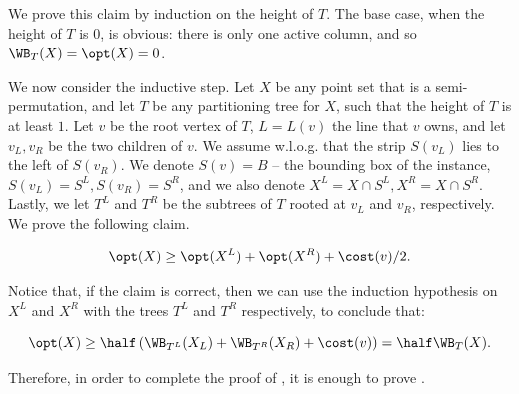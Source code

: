 We prove this claim by induction on the height of $T$. 
The base case, when the height of $T$ is $0$, is obvious: there is only one active column, and so $\WB_T(X) = \opt(X) = 0$. 



We now consider the inductive step.
Let $X$ be any point set that is a semi-permutation, and let $T$ be any partitioning tree for $X$, such that the height of $T$ is at least $1$. Let $v$ be the root vertex of $T$, $L=L(v)$ the line that $v$ owns, and let $v_L,v_R$ be the two children of $v$. We assume w.l.o.g. that 
the strip $S(v_L)$ lies to the left of $S(v_R)$. We denote $S(v)=B$ -- the bounding box of the instance, $S(v_L)=S^L,S(v_R)=S^R$, and we also denote $X^L=X\cap S^L,X^R=X\cap S^R$. Lastly, we let $T^L$ and $T^R$ be the subtrees of $T$ rooted at $v_L$ and $v_R$, respectively.
We prove the following claim.

\begin{claim}\label{claim: ind step}
	\[\opt(X)\geq \opt(X^L)+\opt(X^R)+\cost(v)/2.\]
	\end{claim}

Notice that, if the claim is correct, then we can use the induction hypothesis on $X^L$ and $X^R$ with the trees $T^L$ and $T^R$ respectively, to conclude that:

\[\opt(X)\geq \half \left(\WB_{T^L}(X_L)+\WB_{T^R}(X_R)+\cost(v)\right )=\half \WB_T(X).\]

Therefore, in order to complete the proof of , it is enough to prove .

